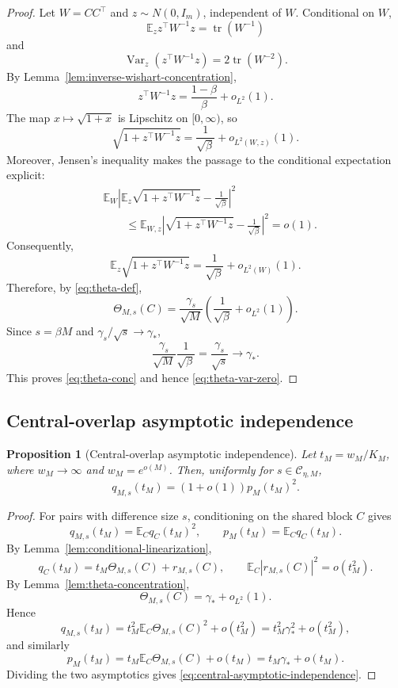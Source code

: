 \documentclass[11pt]{article}
\newtheorem{proposition}{Proposition}
\DeclareMathOperator{\tr}{tr}
\DeclareMathOperator{\Var}{Var}
\newcommand{\Ebb}{\mathbb E}
\newcommand{\1}{\mathbf 1}
\begin{document}
\begin{proof}
Let \(W=CC^\top\) and \(z\sim N(0,I_m)\), independent of \(W\).  Conditional on \(W\),
\[
        \Ebb_z z^\top W^{-1}z=\tr(W^{-1})
\]
and
\[
        \Var_z(z^\top W^{-1}z)=2\tr(W^{-2}).
\]
By Lemma~\ref{lem:inverse-wishart-concentration},
\[
        z^\top W^{-1}z
        =\frac{1-\beta}{\beta}+o_{L^2}(1).
\]
The map \(x\mapsto\sqrt{1+x}\) is Lipschitz on \([0,\infty)\), so
\[
        \sqrt{1+z^\top W^{-1}z}
        =
        \frac{1}{\sqrt\beta}+o_{L^2(W,z)}(1).
\]
Moreover, Jensen's inequality makes the passage to the conditional expectation
explicit:
\begin{align*}
        &\Ebb_W
        \left|
        \Ebb_z\sqrt{1+z^\top W^{-1}z}
        -
        \frac{1}{\sqrt\beta}
        \right|^2
        \\
        &\qquad\le
        \Ebb_{W,z}
        \left|
        \sqrt{1+z^\top W^{-1}z}
        -
        \frac{1}{\sqrt\beta}
        \right|^2
        =o(1).
\end{align*}
Consequently,
\[
        \Ebb_z\sqrt{1+z^\top W^{-1}z}
        =
        \frac{1}{\sqrt\beta}+o_{L^2(W)}(1).
\]
Therefore, by \eqref{eq:theta-def},
\[
        \Theta_{M,s}(C)
        =
        \frac{\gamma_s}{\sqrt M}
        \left(\frac{1}{\sqrt\beta}+o_{L^2}(1)\right).
\]
Since \(s=\beta M\) and \(\gamma_s/\sqrt s\to\gamma_\ast\),
\[
        \frac{\gamma_s}{\sqrt M}\frac1{\sqrt\beta}
        =
        \frac{\gamma_s}{\sqrt s}
        \longrightarrow \gamma_\ast.
\]
This proves \eqref{eq:theta-conc} and hence \eqref{eq:theta-var-zero}.
\end{proof}

\subsection{Central-overlap asymptotic independence}

\begin{proposition}[Central-overlap asymptotic independence]
\label{prop:central-asymptotic-independence}
Let \(t_M=w_M/K_M\), where \(w_M\to\infty\) and \(w_M=e^{o(M)}\).  Then, uniformly for
\(s\in\mathcal C_{\eta,M}\),
\begin{equation}
        q_{M,s}(t_M)=(1+o(1))p_M(t_M)^2.
        \label{eq:central-asymptotic-independence}
\end{equation}
\end{proposition}

\begin{proof}
For pairs with difference size \(s\), conditioning on the shared block \(C\) gives
\[
        q_{M,s}(t_M)=\Ebb_C q_C(t_M)^2,
        \qquad
        p_M(t_M)=\Ebb_C q_C(t_M).
\]
By Lemma~\ref{lem:conditional-linearization},
\[
        q_C(t_M)=t_M\Theta_{M,s}(C)+r_{M,s}(C),
        \qquad
        \Ebb_C|r_{M,s}(C)|^2=o(t_M^2).
\]
By Lemma~\ref{lem:theta-concentration},
\[
        \Theta_{M,s}(C)=\gamma_\ast+o_{L^2}(1).
\]
Hence
\[
        q_{M,s}(t_M)
        =t_M^2\Ebb_C\Theta_{M,s}(C)^2+o(t_M^2)
        =t_M^2\gamma_\ast^2+o(t_M^2),
\]
and similarly
\[
        p_M(t_M)
        =t_M\Ebb_C\Theta_{M,s}(C)+o(t_M)
        =t_M\gamma_\ast+o(t_M).
\]
Dividing the two asymptotics gives \eqref{eq:central-asymptotic-independence}.
\end{proof}
\end{document}
